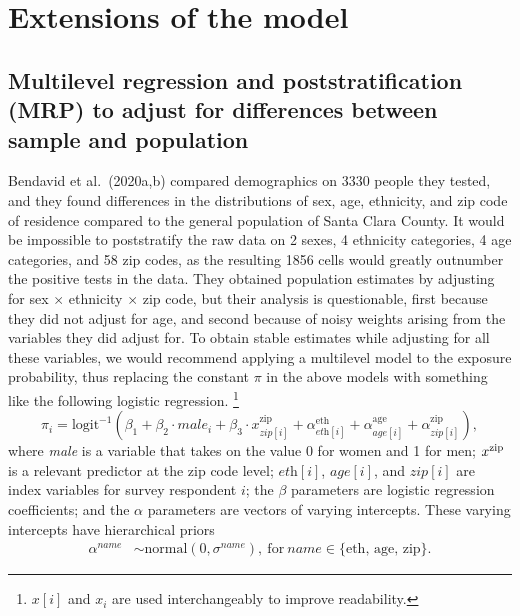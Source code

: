 \documentclass[11pt]{article}
\begin{document}
\section{Extensions of the model}

\subsection{Multilevel regression and poststratification (MRP) to adjust for differences between sample and population}\label{mrp}

Bendavid et al.\ (2020a,b) compared demographics on 3330 people they
tested, and they found differences in the distributions of sex, age,
ethnicity, and zip code of residence compared to the general
population of Santa Clara County. It would be impossible to
poststratify the raw data on 2 sexes, 4 ethnicity categories, 4 age
categories, and 58 zip codes, as the resulting 1856 cells would
greatly outnumber the positive tests in the data.  They obtained
population estimates by adjusting for sex $\times$ ethnicity $\times$
zip code, but their analysis is questionable, first because they did
not adjust for age, and second because of noisy weights arising from
the variables they did adjust for.  To obtain stable estimates while
adjusting for all these variables, we would recommend applying a
multilevel model to the exposure probability, thus replacing the
constant $\pi$ in the above models with something like the following logistic
regression.%
%
\footnote{$x[i]$ and $x_i$ are used interchangeably to improve readability.}
%
\begin{equation}\label{mrp.model}
\pi_i = \mbox{logit}^{-1}(\beta_1 + \beta_2 \cdot \textit{male}_i + \beta_3 \cdot x^{\textrm{zip}}_{\textit{zip}[i]} + \alpha^{\textrm{eth}}_{\textit{eth}[i]} + \alpha^{\textrm{age}}_{\textit{age}[i]} + \alpha^{\textrm{zip}}_{\textit{zip}[i]}),
\end{equation}
%
where {\it male} is a variable that takes on the value 0 for women and
1 for men; $x^{\rm zip}$ is a relevant predictor at the zip code
level; $\textit{eth}[i]$, $\textit{age}[i]$, and $\textit{zip}[i]$ are
index variables for survey respondent $i$; the $\beta$ parameters are logistic
regression coefficients; and the $\alpha$ parameters are vectors of varying
intercepts.  These varying intercepts have hierarchical priors
%
\begin{align*}
  \alpha^{\textit{name}} &\sim \mbox{normal}(0, \sigma^{\textit{name}}), \ \textrm{for} \ \textit{name} \in \{ \textrm{eth, age, zip} \}.
\end{align*}
%
\end{document}
